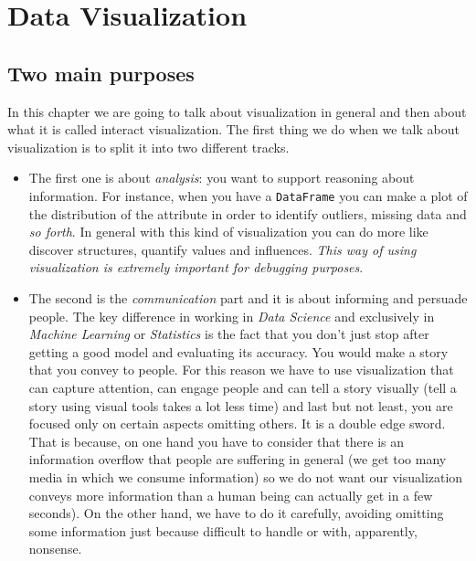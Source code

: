 

\section{Data Visualization}
\subsection{Two main purposes}

In this chapter we are going to talk about visualization in general and then about what it is called interact visualization. The first thing we do when we talk about visualization is to split it into two different tracks. 

\begin{itemize}
\item {The first one is about \emph{analysis}: you want to support reasoning about information. For instance, when you have a \texttt{DataFrame} you can make a plot of the distribution of the attribute in order to identify outliers, missing data and \emph{so forth}. In general with this kind of visualization you can do more like discover structures, quantify values and influences.
\emph{This way of using visualization is extremely important for debugging purposes}.}

\item{The second  is the \emph{communication} part and it is about informing and persuade people.  The key difference in working in \emph{Data Science} and exclusively in \emph{Machine Learning} or \emph{Statistics} is the fact that you don't just stop after getting a good model and evaluating its accuracy. You would make a story that you convey to people.
For this reason we have to use visualization that can capture attention, can engage people and can tell a story visually (tell a story using visual tools takes a lot less time) and last but not least, you are focused only on certain aspects omitting others. It is a double edge sword. That is because, on one hand you have to consider that there is an information overflow that people are suffering in general (we get too many media in which we consume information) so we do not want our visualization conveys more information than  a human being can actually get in a few seconds). On the other hand, we have to do it carefully, avoiding omitting some information just because difficult to handle or with, apparently, nonsense.}
\end{itemize}

